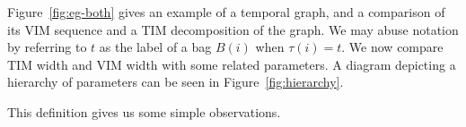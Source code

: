 \documentclass[a4paper,UKenglish,cleveref, autoref, thm-restate]{lipics-v2021} %
\begin{document}
Figure~\ref{fig:eg-both} gives an example of a temporal graph, and a comparison of its VIM sequence and a TIM decomposition of the graph. We may abuse notation by referring to $t$ as the label of a bag $B(i)$ when $\tau(i)=t$. We now compare TIM width and VIM width with some related parameters. A diagram depicting a hierarchy of parameters can be seen in Figure~\ref{fig:hierarchy}.

\begin{toappendix}
This definition gives us some simple observations.
    
\end{toappendix}


\end{document}
